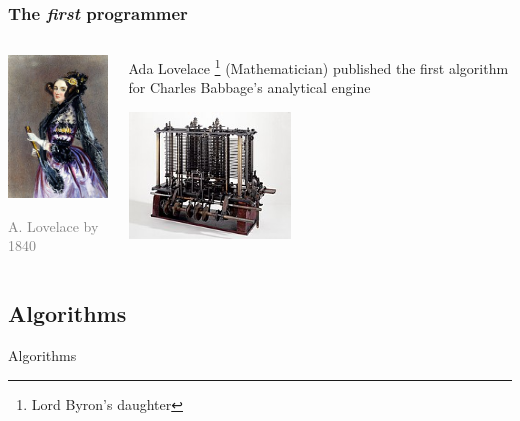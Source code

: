 \documentclass[xcolor=x11names]{beamer}
\newcommand{\light}[1]{\textcolor{gray}{#1}}
\begin{document}
\begin{frame}
\frametitle{The \textit{first} programmer}

\begin{columns}
\begin{column}{0.4\textwidth}
\begin{center}
\includegraphics[width=43mm]{img/Ada_Lovelace_portrait.jpg}

\footnotesize
\light{A. Lovelace by 1840}
\end{center}
\end{column}

\begin{column}{0.55\textwidth}

\alert{Ada Lovelace}%
\footnote{Lord Byron’s daughter}
(Mathematician) published the first algorithm for Charles Babbage’s 
\alert{analytical engine}

\begin{center}
\includegraphics[width=43mm]{img/Babbages_Analytical_Engine_1834-1871.jpg}
\end{center}

\end{column}
\end{columns}
\end{frame}

 
\begin{frame}
\section{Algorithms}
\centering
\alert{Algorithms}
\end{frame}
\end{document}
